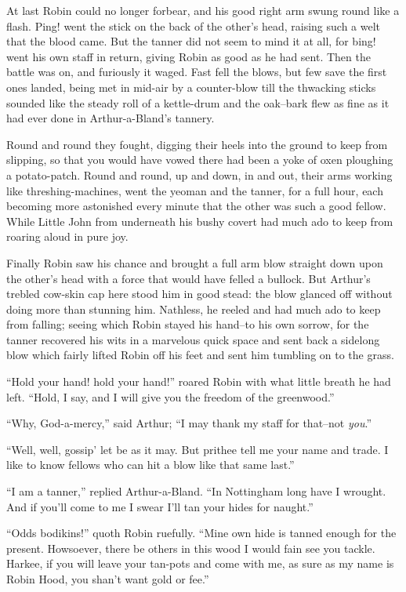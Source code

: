 At last Robin could no longer forbear, and his good right arm swung
round like a flash. Ping! went the stick on the back of the other's
head, raising such a welt that the blood came. But the tanner did not
seem to mind it at all, for bing! went his own staff in return, giving
Robin as good as he had sent. Then the battle was on, and furiously it
waged. Fast fell the blows, but few save the first ones landed, being
met in mid-air by a counter-blow till the thwacking sticks sounded like
the steady roll of a kettle-drum and the oak--bark flew as fine as it
had ever done in Arthur-a-Bland's tannery.

Round and round they fought, digging their heels into the ground to keep
from slipping, so that you would have vowed there had been a yoke of
oxen ploughing a potato-patch. Round and round, up and down, in and out,
their arms working like threshing-machines, went the yeoman and the
tanner, for a full hour, each becoming more astonished every minute that
the other was such a good fellow. While Little John from underneath his
bushy covert had much ado to keep from roaring aloud in pure joy.

Finally Robin saw his chance and brought a full arm blow straight down
upon the other's head with a force that would have felled a bullock. But
Arthur's trebled cow-skin cap here stood him in good stead: the blow
glanced off without doing more than stunning him. Nathless, he reeled
and had much ado to keep from falling; seeing which Robin stayed his
hand--to his own sorrow, for the tanner recovered his wits in a
marvelous quick space and sent back a sidelong blow which fairly lifted
Robin off his feet and sent him tumbling on to the grass.

``Hold your hand! hold your hand!'' roared Robin with what little breath
he had left. ``Hold, I say, and I will give you the freedom of the
greenwood.''

``Why, God-a-mercy,'' said Arthur; ``I may thank my staff for that--not
\emph{you}.''

``Well, well, gossip' let be as it may. But prithee tell me your name
and trade. I like to know fellows who can hit a blow like that same
last.''

``I am a tanner,'' replied Arthur-a-Bland. ``In Nottingham long have I
wrought. And if you'll come to me I swear I'll tan your hides for
naught.''

``Odds bodikins!'' quoth Robin ruefully. ``Mine own hide is tanned
enough for the present. Howsoever, there be others in this wood I would
fain see you tackle. Harkee, if you will leave your tan-pots and come
with me, as sure as my name is Robin Hood, you shan't want gold or
fee.''

